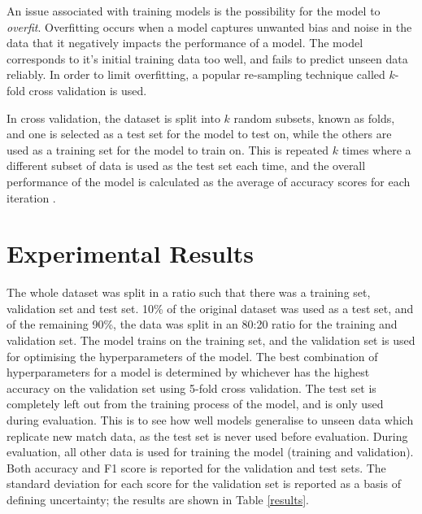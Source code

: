 An issue associated with training models is the possibility for the model to \textit{overfit}. Overfitting occurs when a model captures unwanted bias and noise in the data that it negatively impacts the performance of a model. The model corresponds to it's initial training data too well, and fails to predict unseen data reliably. In order to limit overfitting, a popular re-sampling technique called $k$-fold cross validation is used.

In cross validation, the dataset is split into $k$ random subsets, known as folds, and one is selected as a test set for the model to test on, while the others are used as a training set for the model to train on. This is repeated $k$ times where a different subset of data is used as the test set each time, and the overall performance of the model is calculated as the average of accuracy scores for each iteration \cite{berrar2019cross}.

\section{Experimental Results} \label{experresults}
The whole dataset was split in a ratio such that there was a training set, validation set and test set. 10\% of the original dataset was used as a test set, and of the remaining 90\%, the data was split in an 80:20 ratio for the training and validation set.
The model trains on the training set, and the validation set is used for optimising the hyperparameters of the model. The best combination of hyperparameters for a model is determined by whichever has the highest accuracy on the validation set using 5-fold cross validation.
The test set is completely left out from the training process of the model, and is only used during evaluation. This is to see how well models generalise to unseen data which replicate new match data, as the test set is never used before evaluation. During evaluation, all other data is used for training the model (training and validation).
Both accuracy and F1 score is reported for the validation and test sets. The standard deviation for each score for the validation set is reported as a basis of defining uncertainty; the results are shown in Table \ref{results}.

